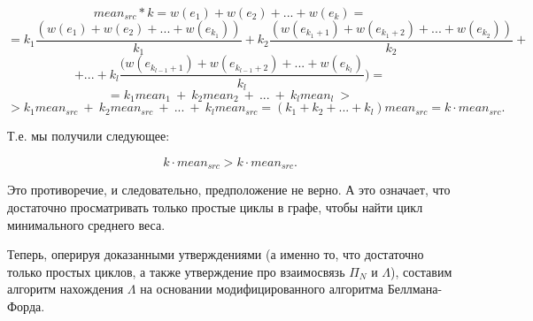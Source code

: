 \documentclass[a4paper,12pt]{report}
\theoremstyle{plain} %
\theoremstyle{definition}
\theoremstyle{remark}
\begin{document}
\begin{large}
$$mean_{src} * k = w(e_1) + w(e_2) + ... + w(e_k) =$$
$$= k_1\frac{(w(e_1) +  w(e_2) +  ... + w(e_{k_1}))}{k_1} + k_2\frac{(w(e_{k_1+1}) + w(e_{k_1+2}) + ... + w(e_{k_2}))}{k_2} +$$
$$+ ... + k_l\frac{(w(e_{k_{l-1}+1}) + w(e_{k_{l-1}+2}) + ... + w(e_{k_l})}{k_l}) = $$
$$=k_1mean_1 ~+ ~k_2mean_2 ~+ ~... ~+ ~k_lmean_l~ >$$
$$> k_1mean_{src}~ +~ k_2mean_{src}~ +~ ...~ +~ k_lmean_{src} = (k_1 + k_2 + ... + k_l)mean_{src} = k \cdot mean_{src}.$$

Т.е. мы получили следующее:

$$k \cdot mean_{src} > k \cdot mean_{src}.$$

Это противоречие, и следовательно, предположение не верно. А это означает, что достаточно просматривать только простые циклы в графе, чтобы найти цикл минимального среднего веса.

Теперь, оперируя доказанными утверждениями (а именно то, что достаточно только простых циклов, а также утверждение про взаимосвязь $\Pi_N$ и $\Lambda$), составим алгоритм нахождения $\Lambda$ на основании модифицированного алгоритма Беллмана-Форда.


\end{large}
\end{document}
